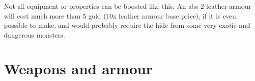 
Not all equipment or properties can be boosted like this. An abs 2 leather armour will cost much more than 5 gold (10x leather armour base price), if it is even possible to make, and would probably require the hide from some very exotic and dangerous monsters.











\pagebreak[1]
\section*{Weapons and armour}






